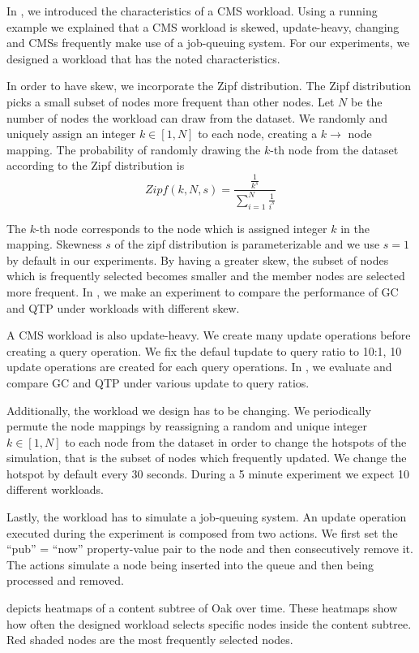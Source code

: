 \documentclass[abstracton,12pt]{scrartcl}
\theoremstyle{definition}
\begin{document}
In , we introduced the characteristics of a CMS
workload. Using a running example we explained that a CMS workload is skewed,
update-heavy, changing and CMSs frequently make use of a job-queuing system.
For our experiments, we designed a workload that has the noted characteristics.

In order to have skew, we incorporate the Zipf distribution. The Zipf
distribution picks a small subset of nodes more frequent than other nodes. 
Let $N$ be the number of nodes the workload can draw from the dataset.
We randomly and uniquely assign an integer $k \in [1, N]$ to each node, creating 
a  $k \rightarrow$ node mapping. The probability of randomly drawing the $k$-th node 
from the dataset according to the Zipf distribution is
$$ Zipf(k,N,s) = \frac{\frac{1}{k^s}}{\sum_{i=1}^{N}\frac{1}{i^s}} $$

The $k$-th node corresponds to the node which is assigned integer $k$ in the mapping.
Skewness $s$ of the zipf distribution is parameterizable and we use $s=1$ by
default in our experiments. By having a greater skew, the subset of nodes which
is frequently selected becomes smaller and the member nodes are selected more
frequent. In , we make an experiment to compare the performance
of GC and QTP under workloads with different skew.

A CMS workload is also update-heavy. We create many update operations before
creating a query operation. We fix the defaul tupdate to query ratio to 10:1, 10 update
operations are created for each query operations. In
, we evaluate and compare GC and QTP under various
update to query ratios.

Additionally, the workload we design has to be changing. We periodically permute 
the node mappings by reassigning a random and unique integer $k \in [1,N]$ to each
node from the dataset in order to change the hotspots of the simulation, that is
the subset of nodes which frequently updated.
We change the hotspot by default every 30 seconds. During a 5 minute
experiment we expect 10 different workloads.

Lastly, the workload has to simulate a job-queuing system. An update operation
executed  during the experiment is composed from two actions. We first set the
``pub'' = ``now'' property-value pair to the node and then consecutively remove
it. The actions simulate a node being inserted into the queue and then being
processed and removed.

 depicts heatmaps of a content subtree of Oak over time.
These heatmaps show how often the designed workload selects specific nodes
inside the content subtree. Red shaded nodes are the most frequently selected nodes.
\end{document}
